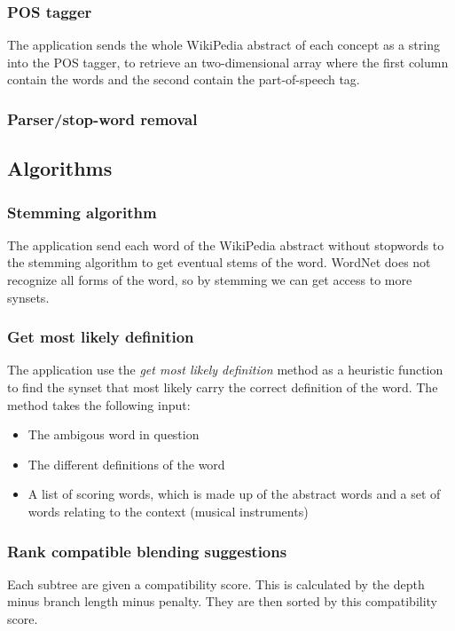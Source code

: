 \subsubsection{POS tagger}
The application sends the whole WikiPedia abstract of each concept as a string into the POS tagger, to retrieve an two-dimensional array where the first column contain the words and the second contain the part-of-speech tag.

\subsubsection{Parser/stop-word removal}


\subsection{Algorithms}

\subsubsection{Stemming algorithm}
The application send each word of the WikiPedia abstract without stopwords to the stemming algorithm to get eventual stems of the word. WordNet does not recognize all forms of the word, so by stemming we can get access to more synsets.

\subsubsection{Get most likely definition}
The application use the \emph{get most likely definition} method as a heuristic function to find the synset that most likely carry the correct definition of the word. The method takes the following input:
\begin{itemize}
	\item The ambigous word in question
	\item The different definitions of the word
	\item A list of scoring words, which is made up of the abstract words and a set of words relating to the context (musical instruments)
\end{itemize}

\subsubsection{Rank compatible blending suggestions}
Each subtree are given a compatibility score. This is calculated by the depth minus branch length minus penalty. They are then sorted by this compatibility score.

